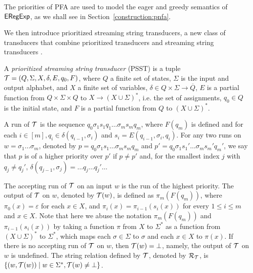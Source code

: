 The priorities of PFA are used to model the eager and greedy semantics of ${\sf ERegExp}$, as we shall see in Section~\ref{construction:pnfa}.



We then introduce prioritized streaming string transducers, a new class of transducers that combine prioritized transducers \cite{BM17} %
and streaming string transducers \cite{AC10,AD11}.
  
\begin{definition}
A \emph{prioritized streaming string transducer} (PSST) is a tuple $\mathcal{T} = (Q, \Sigma, X, \delta, E, q_0, F)$, where $Q$ a
finite set of states, $\Sigma$ is the input and output alphabet, and $X$ a finite set of variables, $\delta \in Q \times \Sigma \rightarrow \overline{Q}$, $E$ is a partial function from $Q \times \Sigma \times
  Q$ to $X \rightarrow (X \cup \Sigma)^{\ast}$, i.e. the set of assignments,
   $q_0 \in Q$ is the initial state, and $F$ is a partial function
  from $Q$ to $(X \cup \Sigma)^{\ast}$.

A run of $\mathcal{T}$ is the sequence $q_0 \sigma_1 s_1 q_1 \ldots \sigma_m s_m q_m$, where $F (q_m)$ is defined and for each $i \in [m], q_i \in \delta (q_{i-1}, \sigma_i)$ and $s_i = E (q_{i - 1}, \sigma_i, q_i)$. For any two runs on $w = \sigma_1 \ldots \sigma_m$, denoted by $p = q_0 \sigma_1 s_1 \ldots \sigma_m s_m q_m$ and $p' = q_0 \sigma_1
  s_1' \ldots \sigma_m s_m' q_m'$, we say that $p$ is of a higher priority over
  $p'$ if $p \neq p'$ and, for the smallest index $j$ with $q_j \neq q_j'$,
  $\delta (q_{j - 1}, \sigma_j) = \ldots q_j \ldots q_j' \ldots$
  
  The accepting run of $\mathcal{T}$ on an input $w$ is the run of the highest priority. The output of $\mathcal{T}$ on $w$, denoted by $\mathcal{T}(w)$, is defined as $\pi_m(F(q_m))$, where $\pi_0(x) = \varepsilon$ for each $x \in X$, and $\pi_{i}(x) = \pi_{i-1}(s_{i}(x))$ for every $1 \le i \le m$ and $x \in X$. Note that here we abuse the notation  $\pi_m(F(q_m))$ and $\pi_{i-1}(s_{i}(x))$ by taking a function $\pi$ from $X$ to $\Sigma^*$ as a function from $(X \cup \Sigma)^*$ to $\Sigma^*$, which maps each $\sigma \in \Sigma$ to $\sigma$ and each $x \in X$ to $\pi(x)$. If there is no accepting run of $\mathcal{T}$ on $w$, then $\mathcal{T}(w) = \bot$, namely, the output of $\mathcal{T}$ on $w$ is undefined. The string relation defined by $\mathcal{T}$, denoted by $\mathcal{R}_{\mathcal{T}}$,  is $\{(w, \mathcal{T}(w)) \mid w \in \Sigma^\ast, \mathcal{T}(w) \neq \bot\}$.
\end{definition}


